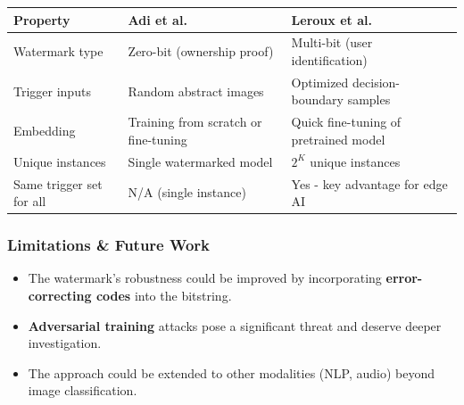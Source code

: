 \documentclass[11pt]{article}
\providecommand{\tightlist}{%
      \setlength{\itemsep}{0pt}\setlength{\parskip}{0pt}}
\begin{document}
{\def\LTcaptype{none} %
\begin{longtable}[]{@{}
  >{\raggedright\arraybackslash}p{}
  >{\raggedright\arraybackslash}p{}
  >{\raggedright\arraybackslash}p{}@{}}
\toprule\noalign{}
\begin{minipage}[b]{\linewidth}\raggedright
Property
\end{minipage} & \begin{minipage}[b]{\linewidth}\raggedright
Adi et al.
\end{minipage} & \begin{minipage}[b]{\linewidth}\raggedright
Leroux et al.
\end{minipage} \\
\midrule\noalign{}
\endhead
\bottomrule\noalign{}
\endlastfoot
Watermark type & Zero-bit (ownership proof) & Multi-bit (user
identification) \\
Trigger inputs & Random abstract images & Optimized decision-boundary
samples \\
Embedding & Training from scratch or fine-tuning & Quick fine-tuning of
pretrained model \\
Unique instances & Single watermarked model & \(2^K\) unique
instances \\
Same trigger set for all & N/A (single instance) & Yes - key advantage
for edge AI \\
\end{longtable}
}

\subsubsection{Limitations \& Future
Work}\label{limitations-future-work}

\begin{itemize}
\tightlist
\item
  The watermark's robustness could be improved by incorporating
  \textbf{error-correcting codes} into the bitstring.
\item
  \textbf{Adversarial training} attacks pose a significant threat and
  deserve deeper investigation.
\item
  The approach could be extended to other modalities (NLP, audio) beyond
  image classification.
\end{itemize}


    
    
    
\end{document}
